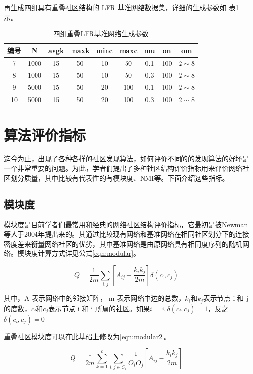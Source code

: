 再生成四组具有重叠社区结构的 LFR 基准网络数据集，详细的生成参数如
表\ref{tab:tab5-6}示。 

\begin{table}
  \centering
  \caption{四组重叠LFR基准网络生成参数} \label{tab:tab5-6}
  \begin{tabular*}{0.9\textwidth}{@{\extracolsep{\fill}}ccccccccc}
  \toprule
    编号		&N  &avgk &maxk &minc &maxc &mu &on &om\\
  \midrule
    7	&1000  &15 &50 &10 &50 &0.1 &100 &$2\sim 8$\\
    8 &1000  &15 &50 &10 &50 &0.3 &100 &$2\sim 8$\\
    9 &5000  &15 &50 &20 &100 &0.1 &100 &$2\sim 8$\\
    10 &5000  &15 &50 &20 &100 &0.3 &100 &$2\sim 8$\\
  \bottomrule
  \end{tabular*}
\end{table}

\section{算法评价指标}
迄今为止，出现了各种各样的社区发现算法，如何评价不同的的发现算法的好坏是一个非常重要的问题。为此，学者们提出了多种社区结构评价指标用来评价网络社区划分质量，其中比较有代表性的有模块度、NMI等。下面介绍这些指标。

\subsection{模块度}
模块度是目前学者们最常用和经典的网络社区结构评价指标，它最初是被Newman等人于2004年提出来的\cite{2002Community}。其通过比较现有网络和基准网络在相同社区划分下的连接密度差来衡量网络社区的优劣，其中基准网络是由原网络具有相同度序列的随机网络。模块度计算方式详见公式\ref{eqn:modular}。

\begin{equation}
  \label{eqn:modular}
  Q=\frac{1}{2m}\sum_{i,j}\left [ A_{ij}-\frac{k_ik_j}{2m} \right ]\delta (c_i, c_j)  
\end{equation}

其中，A 表示网络中的邻接矩阵， m 表示网络中边的总数，$k_i$和$k_j$表示节点 i 和 j 的度数，$c_i$和$c_j$表示节点 i 和 j 所属的社区。如果$i=j,\delta(c_i,c_j)=1$，反之$\delta(c_i,c_j)=0$

重叠社区模块度可以在此基础上修改为\ref{eqn:modular2}。

\begin{equation}
  \label{eqn:modular2}
  Q=\frac{1}{2m} \sum_{k=1}^c \sum_{i,j \in C_k} \frac{1}{O_iO_j} \left [ A_{ij}-\frac{k_ik_j}{2m} \right ]  
\end{equation}

